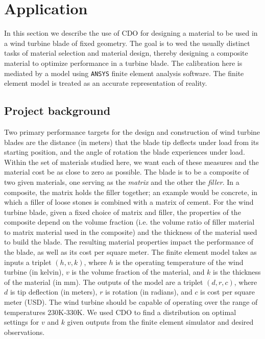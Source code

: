 \documentclass[12pt]{article}
\begin{document}
\section{Application}\label{application}

In this section we describe the use of CDO for designing a material to be used in a wind turbine blade of fixed geometry. 
%
The goal is to wed the usually distinct tasks of material selection and material design, thereby designing a composite material to optimize performance in a turbine blade.
%
The calibration here is mediated by a model using \texttt{ANSYS} finite element analysis software. 
%
The finite element model is treated as an accurate representation of reality.

\subsection{Project background}

Two primary performance targets for the design and construction of wind turbine blades are the distance (in meters) that the blade tip deflects under load from its starting position, and the angle of rotation the blade experiences under load.
%
Within the set of materials studied here, we want each of these measures and the material cost be as close to zero as possible.
%
The blade is to be a composite of two given materials, one serving as the \textit{matrix} and the other the \textit{filler}. 
%
In a composite, the matrix holds the filler together; an example would be concrete, in which a filler of loose stones is combined with a matrix of cement.
%
For the wind turbine blade, given a fixed choice of matrix and filler, the properties of the composite depend on the volume fraction (i.e. the volume ratio of filler material to matrix material used in the composite) and the thickness of the material used to build the blade. 
%
The resulting material properties impact the performance of the blade, as well as its cost per square meter. 
%
The finite element model takes as inputs a triplet $(h,v,k)$, where $h$ is the operating temperature of the wind turbine (in kelvin), $v$ is the volume fraction of the material, and $k$ is the thickness of the material (in mm). 
%
The outputs of the model are a triplet $(d,r,c)$, where $d$ is tip deflection (in meters), $r$ is rotation (in radians), and $c$ is cost per square meter (USD).
% 
The wind turbine should be capable of operating over the range of temperatures 230K-330K. 
%
We used CDO to find a distribution on optimal settings for $v$ and $k$ given outputs from the finite element simulator and desired observations.
\end{document}
